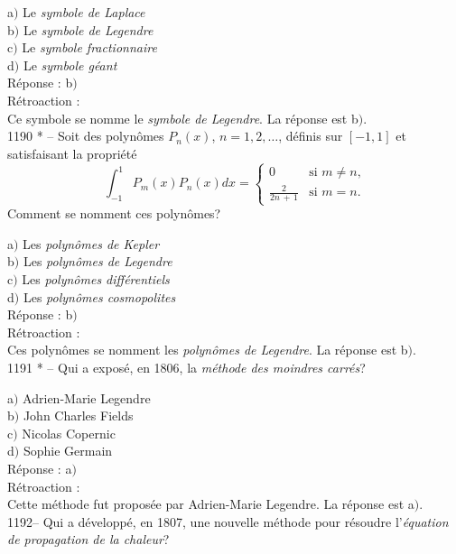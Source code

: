 ﻿\documentclass[letterpaper, 12pt]{article}
\begin{document}
a$)$ Le {\sl symbole de Laplace} \\
b$)$ Le {\sl symbole de Legendre} \\
c$)$ Le {\sl symbole fractionnaire} \\
d$)$ Le {\sl symbole g\'eant}\\

R\'eponse : b$)$\\

R\'etroaction : \\
Ce symbole se nomme le {\sl symbole de Legendre}.
La r\'eponse est b$)$.\\

1190 * -- Soit des polyn\^omes $P_n(x)$, $n=1,2,\ldots$, d\'efinis sur
$[-1,1]$ et satisfaisant la propri\'et\'e
$$\displaystyle{\int_{-1}^1P_m(x)P_n(x)dx=}\begin{cases}
0&\text{si $m\not=n$,}\\[3mm]
\frac2{2n\,+\,1}&\text{si $m=n$.}
\end{cases}$$
Comment se nomment ces polyn\^omes?

a$)$ Les {\sl polyn\^omes de Kepler} \\
b$)$ Les {\sl polyn\^omes de Legendre} \\
c$)$ Les {\sl polyn\^omes diff\'erentiels} \\
d$)$ Les {\sl polyn\^omes cosmopolites}\\

R\'eponse : b$)$\\

R\'etroaction : \\
Ces polyn\^omes se nomment les {\sl polyn\^omes de Legendre}.
La r\'eponse est b$)$.\\

1191 * -- Qui a expos\'e, en 1806, la {\sl m\'ethode des moindres
carr\'es}?

a$)$ Adrien-Marie Legendre \\
b$)$ John Charles Fields \\
c$)$ Nicolas Copernic \\
d$)$ Sophie Germain\\

R\'eponse : a$)$\\

R\'etroaction : \\
Cette m\'ethode fut propos\'ee par Adrien-Marie Legendre.
La r\'eponse est a$)$.\\

1192-- Qui a d\'evelopp\'e, en 1807, une nouvelle m\'ethode pour
r\'esoudre l'{\sl \'equation de propagation de la chaleur}?
\end{document}
